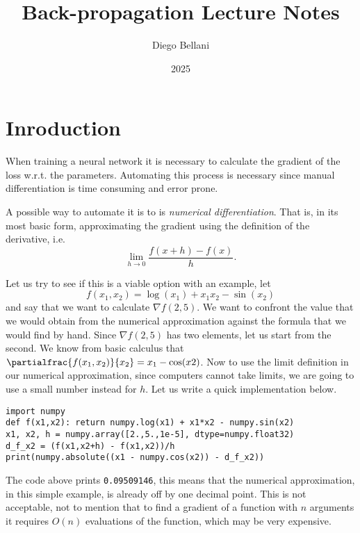 \documentclass{article}
\title{Back-propagation Lecture Notes}
\author{Diego Bellani}
\date{2025}
\begin{document}
\maketitle

\section{Inroduction}

When training a neural network it is necessary to calculate the gradient of the
loss w.r.t. the parameters. Automating this process is necessary since manual
differentiation is time consuming and error prone.

A possible way to automate it is to is \emph{numerical differentiation}. That
is, in its most basic form, approximating the gradient using the definition of
the derivative, i.e. \[\lim_{h \to 0} \frac{f(x+h)-f(x)} h.\]

Let us try to see if this is a viable option with an example, let
\begin{equation}
f(x_1, x_2) = \log(x_1)+x_1x_2-\sin(x_2) \label{eqn:example}
\end{equation}
and say that we want to calculate \(\nabla{f(2,5)}\). We want to confront the
value that we would obtain from the numerical approximation against the formula
that we would find by hand. Since \(\nabla{f(2,5)}\) has two elements, let us
start from the second. We know from basic calculus that
\(\partialfrac{f(x_1,x_2)}{x_2} = x_1-\cos(x2)\). Now to use the limit
definition in our numerical approximation, since computers cannot take limits,
we are going to use a small number instead for \(h\). Let us write a quick
implementation below.

\begin{verbatim}
import numpy
def f(x1,x2): return numpy.log(x1) + x1*x2 - numpy.sin(x2)
x1, x2, h = numpy.array([2.,5.,1e-5], dtype=numpy.float32)
d_f_x2 = (f(x1,x2+h) - f(x1,x2))/h
print(numpy.absolute((x1 - numpy.cos(x2)) - d_f_x2))
\end{verbatim}

The code above prints \texttt{0.09509146}, this means that the numerical
approximation, in this simple example, is already off by one decimal point.
This is not acceptable, not to mention that to find a gradient of a function
with \(n\) arguments it requires \(O(n)\) evaluations of the function, which may
be very expensive.
\end{document}
